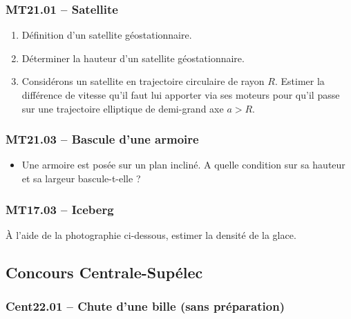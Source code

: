 \subsubsection*{MT21.01 -- Satellite  \corrige}

\begin{enumerate}
    \item Définition d'un satellite géostationnaire.
    \item Déterminer la hauteur d'un satellite géostationnaire.
    \item Considérons un satellite en trajectoire circulaire de rayon $R$. Estimer la différence de vitesse qu'il faut lui apporter via ses moteurs pour qu'il passe sur une trajectoire elliptique de demi-grand axe $a > R$.
\end{enumerate}

\subsubsection*{MT21.03 -- Bascule d'une armoire  \corrige}

\begin{itemize}[label=\textbullet]
    \item Une armoire est posée sur un plan incliné. A quelle condition sur sa hauteur et sa largeur bascule-t-elle ?
\end{itemize}

\subsubsection*{MT17.03 -- Iceberg }

À l'aide de la photographie ci-dessous, estimer la densité de la glace.
\begin{center}
\end{center}

\newpage
\subsection*{Concours Centrale-Supélec}
\subsubsection*{Cent22.01 -- Chute d'une bille (sans préparation)  \corrige}

